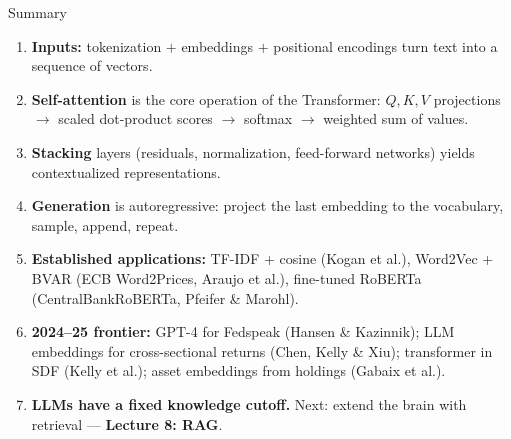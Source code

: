 \begin{frame}{Summary}
\begin{enumerate}
\item \textbf{Inputs:} tokenization $+$ embeddings $+$ positional encodings turn text into a sequence of vectors.
\smallskip
\item \textbf{Self-attention} is the core operation of the Transformer:
$Q,K,V$ projections $\rightarrow$ scaled dot-product scores $\rightarrow$ softmax $\rightarrow$ weighted sum of values.
\smallskip
\item \textbf{Stacking} layers (residuals, normalization, feed-forward networks) yields contextualized representations.
\smallskip
\item \textbf{Generation} is autoregressive: project the last embedding to the vocabulary, sample, append, repeat.
\smallskip
\item \textbf{Established applications:}
TF-IDF + cosine (Kogan et al.),
Word2Vec + BVAR (ECB Word2Prices, Araujo et al.),
fine-tuned RoBERTa (CentralBankRoBERTa, Pfeifer \& Marohl).
\smallskip
\item \textbf{2024--25 frontier:}
GPT-4 for Fedspeak (Hansen \& Kazinnik);
LLM embeddings for cross-sectional returns (Chen, Kelly \& Xiu);
transformer in SDF (Kelly et al.);
asset embeddings from holdings (Gabaix et al.).
\smallskip
\item \textbf{LLMs have a fixed knowledge cutoff.}
Next: extend the brain with retrieval --- \textbf{Lecture 8: RAG}.
\end{enumerate}
\end{frame}


